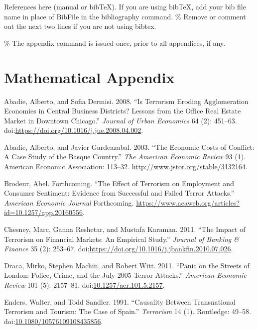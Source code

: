 \documentclass[]{AEA}
\begin{document}
References here (manual or bibTeX). If you are using bibTeX, add your
bib file name in place of BibFile in the bibliography command. \% Remove
or comment out the next two lines if you are not using bibtex.
 

\% The appendix command is issued once, prior to all appendices, if any.
\appendix

\section{Mathematical Appendix}

\hypertarget{refs}{}
\hypertarget{ref-ABADIE2008451}{}
Abadie, Alberto, and Sofia Dermisi. 2008. ``Is Terrorism Eroding
Agglomeration Economies in Central Business Districts? Lessons from the
Office Real Estate Market in Downtown Chicago.'' \emph{Journal of Urban
Economics} 64 (2): 451--63.
doi:\href{https://doi.org/https://doi.org/10.1016/j.jue.2008.04.002}{https://doi.org/10.1016/j.jue.2008.04.002}.

\hypertarget{ref-10.2307ux2f3132164}{}
Abadie, Alberto, and Javier Gardeazabal. 2003. ``The Economic Costs of
Conflict: A Case Study of the Basque Country.'' \emph{The American
Economic Review} 93 (1). American Economic Association: 113--32.
\url{http://www.jstor.org/stable/3132164}.

\hypertarget{ref-B_forthcoming}{}
Brodeur, Abel. Forthcoming. ``The Effect of Terrorism on Employment and
Consumer Sentiment: Evidence from Successful and Failed Terror
Attacks.'' \emph{American Economic Journal} Forthcoming.
\url{https://www.aeaweb.org/articles?id=10.1257/app.20160556}.

\hypertarget{ref-CHESNEY2011253}{}
Chesney, Marc, Ganna Reshetar, and Mustafa Karaman. 2011. ``The Impact
of Terrorism on Financial Markets: An Empirical Study.'' \emph{Journal
of Banking \& Finance} 35 (2): 253--67.
doi:\href{https://doi.org/https://doi.org/10.1016/j.jbankfin.2010.07.026}{https://doi.org/10.1016/j.jbankfin.2010.07.026}.

\hypertarget{ref-10.1257ux2faer.101.5.2157}{}
Draca, Mirko, Stephen Machin, and Robert Witt. 2011. ``Panic on the
Streets of London: Police, Crime, and the July 2005 Terror Attacks.''
\emph{American Economic Review} 101 (5): 2157--81.
doi:\href{https://doi.org/10.1257/aer.101.5.2157}{10.1257/aer.101.5.2157}.

\hypertarget{ref-doi:10.1080ux2f10576109108435856}{}
Enders, Walter, and Todd Sandler. 1991. ``Causality Between
Transnational Terrorism and Tourism: The Case of Spain.''
\emph{Terrorism} 14 (1). Routledge: 49--58.
doi:\href{https://doi.org/10.1080/10576109108435856}{10.1080/10576109108435856}.
\end{document}
